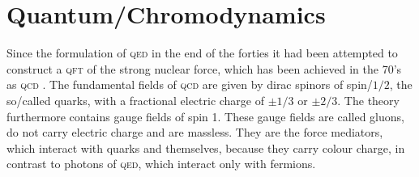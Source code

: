 \documentclass[../../index.tex]{subfiles}
\begin{document}
\section{Quantum\-/Chromodynamics}
\label{sec:quantumchromodynamics}
Since the formulation of \textsc{qed} in the end of the forties it had been
attempted to construct a \textsc{qft} of the strong nuclear force, which has
been achieved in the 70's as \textsc{qcd}
\cite{GellMann1972,Fritzsch1973,Gross1973,Politzer1973,Weinberg1973}. The
fundamental fields of \textsc{qcd} are given by dirac spinors of spin\-/\(1/2\),
the so\-/called quarks, with a fractional electric charge of \(\pm 1/3\) or
\(\pm 2/3\). The theory furthermore contains gauge fields of spin 1. These gauge
fields are called gluons, do not carry electric charge and are massless. They
are the force mediators, which interact with quarks and themselves, because they
carry colour charge, in contrast to photons of \textsc{qed}, which interact only
with fermions. %
\end{document}
